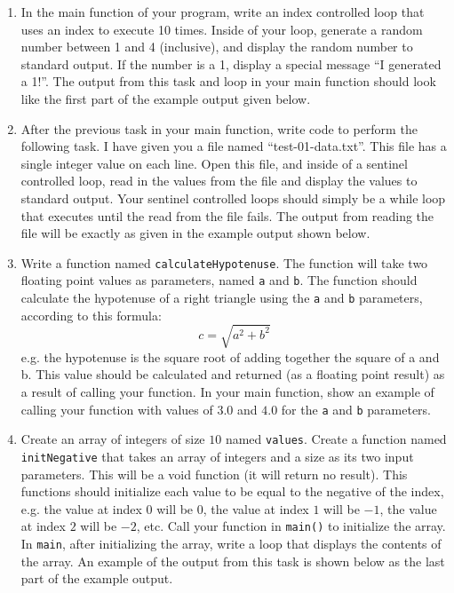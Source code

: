 \documentclass[11pt]{article}
\begin{document}
\begin{enumerate}
\item In the main function of your program, write an index controlled
   loop that uses an index to execute 10 times.  Inside of your loop,
   generate a random number between 1 and 4 (inclusive), and display
   the random number to standard output.  If the number is a 1,
   display a special message ``I generated a 1!''.  The output from this
   task and loop in your main function should look like the first part
   of the example output given below.
\item After the previous task in your main function, write code to
   perform the following task.  I have given you a file named
   ``test-01-data.txt''.  This file has a single integer value on each
   line.  Open this file, and inside of a sentinel controlled loop,
   read in the values from the file and display the values to standard
   output.  Your sentinel controlled loops should simply be a while
   loop that executes until the read from the file fails.  The output
   from reading the file will be exactly as given in the example
   output shown below.
\item Write a function named \verb~calculateHypotenuse~.  The function will
   take two floating point values as parameters, named \verb~a~ and \verb~b~.
   The function should calculate the hypotenuse of a right triangle
   using the \verb~a~ and \verb~b~ parameters, according to this formula: $$ c =
   \sqrt{a^2 + b^2} $$ e.g. the hypotenuse is the square root of
   adding together the square of a and b.  This value should be
   calculated and returned (as a floating point result) as a result of
   calling your function.  In your main function, show an example of
   calling your function with values of $3.0$ and $4.0$ for the \verb~a~
   and \verb~b~ parameters.
\item Create an array of integers of size $10$ named \verb~values~.  Create a
   function named \verb~initNegative~ that takes an array of integers and a
   size as its two input parameters.  This will be a void function (it
   will return no result).  This functions should initialize each
   value to be equal to the negative of the index, e.g. the value at
   index $0$ will be $0$, the value at index $1$ will be $-1$, the
   value at index $2$ will be $-2$, etc.  Call your function in
   \verb~main()~ to initialize the array.  In \verb~main~, after initializing
   the array, write a loop that displays the contents of the array.
   An example of the output from this task is shown below as the last
   part of the example output.
\end{enumerate}
\end{document}
